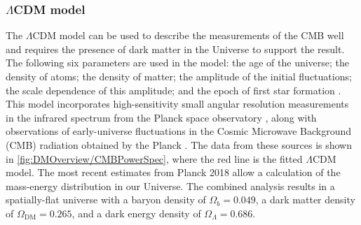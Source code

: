 \subsubsection{$\Lambda$CDM model}\label{sec:DMOverview/LambdaCDM}
The $\Lambda \text{CDM}$ model can be used to describe the measurements of the CMB well and requires the presence of dark matter in the Universe to support the result. The following six parameters are used in the model: the age of the universe; the density of atoms; the density of matter; the amplitude of the initial fluctuations; the scale dependence of this amplitude; and the epoch of first star formation \cite{LCDMparam}. This model incorporates high-sensitivity small angular resolution measurements in the infrared spectrum from the Planck space observatory \cite{2013Planck}, along with observations of early-universe fluctuations in the Cosmic Microwave Background (CMB) radiation obtained by the Planck \cite{WMAP}. The data from these sources is shown in \autoref{fig:DMOverview/CMBPowerSpec}, where the red line is the fitted $\Lambda \text{CDM}$ model. The most recent estimates from Planck 2018 \cite {Planck:2018vyg} allow a calculation of the mass-energy distribution in our Universe. The combined analysis results in a spatially-flat universe with a baryon density of $\Omega_{b}=0.049$, a dark matter density of $\Omega_{\text{DM}}=0.265$, and a dark energy density of $\Omega_{\Lambda}=0.686$.

